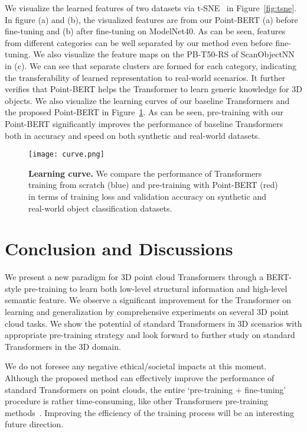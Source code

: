 We visualize the learned features of two datasets via t-SNE~\cite{van2008visualizing} in Figure~\ref{fig:tsne}. In figure (a) and (b), the visualized features are from our Point-BERT (a) before fine-tuning and (b) after fine-tuning on ModelNet40. As can be seen, features from different categories can be well separated by our method even before fine-tuning.
We also visualize the feature maps on the PB-T50-RS of ScanObjectNN in (c). We can see that separate clusters are formed for each category, indicating the transferability of learned representation to real-world scenarios. It further verifies that Point-BERT helps the Transformer to learn generic knowledge for 3D objects. We also visualize the learning curves of our baseline Transformers and the proposed Point-BERT in Figure~\ref{fig:curve}. As can be seen, pre-training with our Point-BERT significantly improves the performance of baseline Transformers both in accuracy and speed on both synthetic and real-world datasets. 

\begin{figure}[t]
\centering \texttt{[image: curve.png]}
\caption{ \textbf{Learning curve.} We compare the performance of Transformers training from scratch (blue) and pre-training with Point-BERT (red) in terms of training loss and validation accuracy on synthetic and real-world object classification datasets.
}
\vspace{-10pt}
\label{fig:curve}
\end{figure}

\section{Conclusion and Discussions}
We present a new paradigm for 3D point cloud Transformers through a BERT-style pre-training to learn both low-level structural information and high-level semantic feature. We observe a significant improvement for the Transformer on learning and generalization by comprehensive experiments on several 3D point cloud tasks. We show the potential of standard Transformers in 3D scenarios with appropriate pre-training strategy and look forward to further study on standard Transformers in the 3D domain. 

We do not foresee any negative ethical/societal impacts at this moment. Although the proposed method can effectively improve the performance of standard Transformers on point clouds, the entire `pre-training + fine-tuning' procedure is rather time-consuming, like other Transformers pre-training methods~\cite{bert, mae, beit}. Improving the efficiency of the training process will be an interesting future direction.

